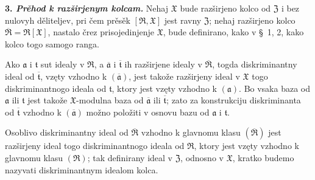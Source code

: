 \documentclass[11pt]{article}
\begin{document}
\setcounter{footnote}{26}

\textbf{3. \emph{Prěhod k razširjenym kolcam.}} Nehaj $\mathfrak X$ bude razširjeno kolco od $\mathfrak Z$ i bez nulovyh děliteljev, pri čem prěsěk $[\mathfrak R,\mathfrak X]$ jest ravny $\mathfrak Z$; nehaj razširjeno kolco $\overline{\mathfrak R}=\mathfrak R[\mathfrak X]$, nastalo črez prisojedinjenje $\mathfrak X$, bude definirano, kako v \S~1, 2, kako kolco togo samogo ranga.

Ako $\mathfrak a$ i $\mathfrak t$ sut idealy v $\mathfrak R$, a $\overline{\mathfrak a}$ i $\overline{\mathfrak t}$ ih razširjene idealy v $\overline{\mathfrak R}$, togda diskriminantny ideal od $\overline{\mathfrak t}$, vzęty vzhodno k $(\overline{\mathfrak a})$, jest takože razširjeny ideal v $\mathfrak X$ togo diskriminantnogo ideala od $\mathfrak t$, ktory jest vzęty vzhodno k $(\mathfrak a)$. Bo vsaka baza od $\mathfrak a$ ili $\mathfrak t$ jest takože $\mathfrak X$-modulna baza od $\overline{\mathfrak a}$ ili $\overline{\mathfrak t}$; zato za konstrukciju diskriminanta od $\overline{\mathfrak t}$ vzhodno k $(\overline{\mathfrak a})$ možno položiti v osnovu bazu od $\mathfrak a$ i $\mathfrak t$.

Osoblivo diskriminantny ideal od $\overline{\mathfrak R}$ vzhodno k glavnomu klasu $(\overline{\mathfrak R})$ jest razširjeny ideal togo diskriminantnogo ideala od $\mathfrak R$, ktory jest vzęty vzhodno k glavnomu klasu $(\mathfrak R)$; tak definirany ideal v $\mathfrak Z$, odnosno v $\mathfrak X$, kratko budemo nazyvati diskriminantnym idealom kolca.
\end{document}
